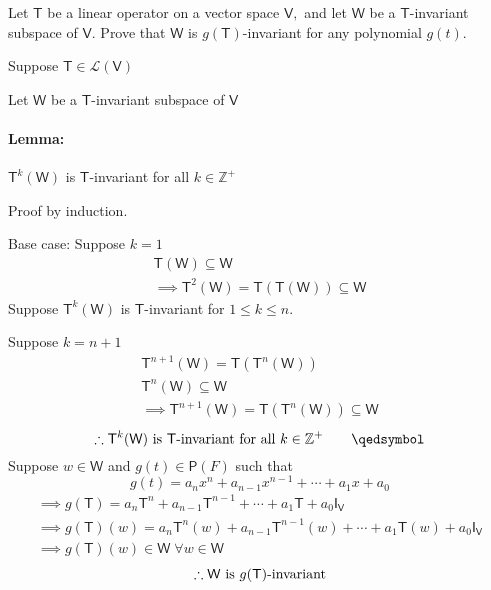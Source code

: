 Let $\mathsf{T}$ be a linear operator on a vector space $\mathsf{V},$
and let $\mathsf{W}$ be a $\mathsf{T}$-invariant subspace of
$\mathsf{V}.$ Prove that $\mathsf{W}$ is $g(\mathsf{T})$-invariant for
any polynomial $g(t).$

Suppose $\mathsf{T} \in \mathcal{L}(\mathsf{V})$ 

Let $\mathsf{W}$ be a $\mathsf{T}$-invariant subspace of $\mathsf{V}$

\paragraph{Lemma:} $\mathsf{T}^k(\mathsf{W})$ is
$\mathsf{T}$-invariant for all $k \in \mathbb{Z}^+$

Proof by induction.

Base case: Suppose $k=1$
\begin{gather}
\mathsf{T}(\mathsf{W}) \subseteq \mathsf{W}\\
\implies \mathsf{T}^2(\mathsf{W}) = \mathsf{T}(\mathsf{T}(\mathsf{W}))
\subseteq \mathsf{W}
\end{gather}
Suppose $\mathsf{T}^k(\mathsf{W})$ is $\mathsf{T}$-invariant for $1
\leq k \leq n.$

Suppose $k=n+1$
\begin{gather}
\mathsf{T}^{n+1}(\mathsf{W}) =
\mathsf{T}(\mathsf{T}^n(\mathsf{W}))\\
\mathsf{T}^n(\mathsf{W}) \subseteq \mathsf{W}\\
\implies \mathsf{T}^{n+1}(\mathsf{W}) =
\mathsf{T}(\mathsf{T}^n(\mathsf{W})) \subseteq \mathsf{W}
\end{gather}
\begin{equation}
\notag \therefore \mathsf{T}^k(\mathsf{W}) \text{ is }
\mathsf{T}\text{-invariant for all } k \in \mathbb{Z}^+ \qquad \qedsymbol
\end{equation}
Suppose $w \in \mathsf{W}$ and $g(t) \in \mathsf{P}(F)$ such that 
\begin{equation}
g(t) = a_nx^n +a_{n-1}x^{n-1} + \dotsb + a_1x + a_0 
\end{equation}
\begin{gather}
\implies g(\mathsf{T}) = a_n\mathsf{T}^n + a_{n-1}\mathsf{T}^{n-1} +
\dotsb + a_1\mathsf{T} +a_0\mathsf{I}_\mathsf{V}\\
\implies g(\mathsf{T})(w) = a_n\mathsf{T}^n(w) +
a_{n-1}\mathsf{T}^{n-1}(w) +\dotsb + a_1\mathsf{T}(w) +
a_0\mathsf{I}_\mathsf{V}\\
\implies g(\mathsf{T})(w) \in \mathsf{W}\; \forall w \in \mathsf{W}
\end{gather}
\begin{equation}
\notag \therefore \mathsf{W} \text{ is } g(\mathsf{T})\text{-invariant}
\end{equation}
